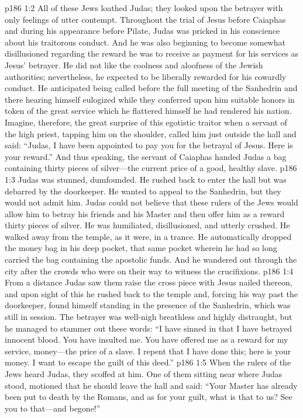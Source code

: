 \vs p186 1:2 All of these Jews loathed Judas; they looked upon the betrayer with only feelings of utter contempt. Throughout the trial of Jesus before Caiaphas and during his appearance before Pilate, Judas was pricked in his conscience about his traitorous conduct. And he was also beginning to become somewhat disillusioned regarding the reward he was to receive as payment for his services as Jesus’ betrayer. He did not like the coolness and aloofness of the Jewish authorities; nevertheless, he expected to be liberally rewarded for his cowardly conduct. He anticipated being called before the full meeting of the Sanhedrin and there hearing himself eulogized while they conferred upon him suitable honors in token of the great service which he flattered himself he had rendered his nation. Imagine, therefore, the great surprise of this egotistic traitor when a servant of the high priest, tapping him on the shoulder, called him just outside the hall and said: “Judas, I have been appointed to pay you for the betrayal of Jesus. Here is your reward.” And thus speaking, the servant of Caiaphas handed Judas a bag containing thirty pieces of silver---the current price of a good, healthy slave.
\vs p186 1:3 Judas was stunned, dumfounded. He rushed back to enter the hall but was debarred by the doorkeeper. He wanted to appeal to the Sanhedrin, but they would not admit him. Judas could not believe that these rulers of the Jews would allow him to betray his friends and his Master and then offer him as a reward thirty pieces of silver. He was humiliated, disillusioned, and utterly crushed. He walked away from the temple, as it were, in a trance. He automatically dropped the money bag in his deep pocket, that same pocket wherein he had so long carried the bag containing the apostolic funds. And he wandered out through the city after the crowds who were on their way to witness the crucifixions.
\vs p186 1:4 From a distance Judas saw them raise the cross piece with Jesus nailed thereon, and upon sight of this he rushed back to the temple and, forcing his way past the doorkeeper, found himself standing in the presence of the Sanhedrin, which was still in session. The betrayer was well\hyp{}nigh breathless and highly distraught, but he managed to stammer out these words: “I have sinned in that I have betrayed innocent blood. You have insulted me. You have offered me as a reward for my service, money---the price of a slave. I repent that I have done this; here is your money. I want to escape the guilt of this deed.”
\vs p186 1:5 When the rulers of the Jews heard Judas, they scoffed at him. One of them sitting near where Judas stood, motioned that he should leave the hall and said: “Your Master has already been put to death by the Romans, and as for your guilt, what is that to us? See you to that---and begone!”
